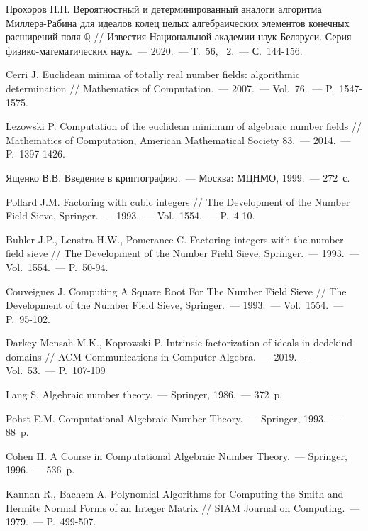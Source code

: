 \documentclass[_00_dissertation.tex]{subfiles}
\begin{document}
\begin{thebibliography}{99}
    Прохоров Н.П. Вероятностный и детерминированный аналоги алгоритма Миллера-Рабина для идеалов колец целых алгебраических элементов конечных расширений поля $\mathbb{Q}$ // Известия Национальной академии наук Беларуси. Серия физико-математических наук.~--- 2020.~--- Т.~56, \textnumero~2.~--- С.~144-156.

    Cerri J. Euclidean minima of totally real number fields: algorithmic determination // Mathematics of Computation.~--- 2007.~--- Vol.~76.~--- P.~1547-1575.

    Lezowski P. Computation of the euclidean minimum of algebraic number fields // Mathematics of Computation, American Mathematical Society 83.~--- 2014.~--- P.~1397-1426.

    Ященко В.В. Введение в криптографию.~--- Москва: МЦНМО, 1999.~--- 272~с.
    
    Pollard J.M. Factoring with cubic integers // The Development of the Number Field Sieve, Springer.~--- 1993.~--- Vol.~1554.~--- P.~4-10.

    Buhler J.P., Lenstra H.W., Pomerance C. Factoring integers with the number field sieve // The Development of the Number Field Sieve, Springer.~--- 1993.~--- Vol.~1554.~--- P.~50-94.

    Couveignes J. Computing A Square Root For The Number Field Sieve // The Development of the Number Field Sieve, Springer.~--- 1993.~--- Vol.~1554.~--- P.~95-102.

    Darkey-Mensah M.K., Koprowski P. Intrinsic factorization of ideals in dedekind domains // ACM Communications in Computer Algebra.~--- 2019.~--- Vol.~53.~--- P.~107-109

    Lang S. Algebraic number theory.~--- Springer, 1986.~--- 372~p.

    Pohst E.M. Computational Algebraic Number Theory.~--- Springer, 1993.~--- 88~p.

    Cohen H. A Course in Computational Algebraic Number Theory.~--- Springer, 1996.~--- 536~p.

    Kannan R., Bachem A. Polynomial Algorithms for Computing the Smith and Hermite Normal Forms of an Integer Matrix // SIAM Journal on Computing.~--- 1979.~--- P.~499-507.


\end{thebibliography}
\end{document}
